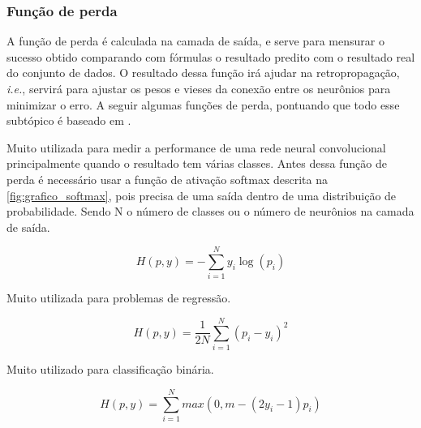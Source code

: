 \subsubsection*{Função de perda}

A função de perda é calculada na camada de saída, e serve para mensurar o sucesso obtido comparando com fórmulas o resultado predito com o resultado real do conjunto de dados. O resultado dessa função irá ajudar na retropropagação, \emph{i.e.}, servirá para ajustar os pesos e vieses da conexão entre os neurônios para minimizar o erro. A seguir algumas funções de perda, pontuando que todo esse subtópico é baseado em 
.


Muito utilizada para medir a performance de uma rede neural convolucional principalmente quando o resultado tem várias classes. Antes dessa função de perda é necessário usar a função de ativação softmax descrita na \cref{fig:grafico_softmax}, pois precisa de uma saída dentro de uma distribuição de probabilidade. Sendo N o número de classes ou o número de neurônios na camada de saída.

\begin{equation} 
    H(p,y) = -\sum_{i=1}^N y_i \log(p_i)
\end{equation}



Muito utilizada para problemas de regressão.

\begin{equation}
    H(p,y) = \frac{1}{2N} \sum_{i=1}^N (p_i - y_i)^2
\end{equation}


Muito utilizado para classificação binária.

\begin{equation}
    H(p,y) = \sum_{i=1}^N max(0, m - (2y_i - 1) p_i)
\end{equation}
